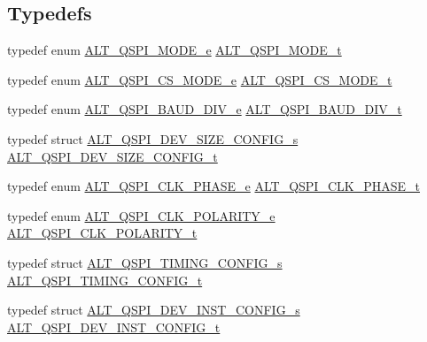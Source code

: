 \subsection*{Typedefs}
\begin{DoxyCompactItemize}
\item 
typedef enum \mbox{\hyperlink{group__ALT__QSPI__DEV__CFG_ga9270168a24ae2256573f5c8cbc5ec691}{A\+L\+T\+\_\+\+Q\+S\+P\+I\+\_\+\+M\+O\+D\+E\+\_\+e}} \mbox{\hyperlink{group__ALT__QSPI__DEV__CFG_ga4d03e307842e1ed33be0039a56ef62c3}{A\+L\+T\+\_\+\+Q\+S\+P\+I\+\_\+\+M\+O\+D\+E\+\_\+t}}
\item 
typedef enum \mbox{\hyperlink{group__ALT__QSPI__DEV__CFG_ga1963b85b7d2bbc2e56ba43d807c9c1b0}{A\+L\+T\+\_\+\+Q\+S\+P\+I\+\_\+\+C\+S\+\_\+\+M\+O\+D\+E\+\_\+e}} \mbox{\hyperlink{group__ALT__QSPI__DEV__CFG_gaffe96455cbf44fb3adb844c576c045fe}{A\+L\+T\+\_\+\+Q\+S\+P\+I\+\_\+\+C\+S\+\_\+\+M\+O\+D\+E\+\_\+t}}
\item 
typedef enum \mbox{\hyperlink{group__ALT__QSPI__DEV__CFG_gabea2bac97b47b7da32cf093e97de90e8}{A\+L\+T\+\_\+\+Q\+S\+P\+I\+\_\+\+B\+A\+U\+D\+\_\+\+D\+I\+V\+\_\+e}} \mbox{\hyperlink{group__ALT__QSPI__DEV__CFG_ga5a183c627f4dc5f1469a227c748b01ec}{A\+L\+T\+\_\+\+Q\+S\+P\+I\+\_\+\+B\+A\+U\+D\+\_\+\+D\+I\+V\+\_\+t}}
\item 
typedef struct \mbox{\hyperlink{structALT__QSPI__DEV__SIZE__CONFIG__s}{A\+L\+T\+\_\+\+Q\+S\+P\+I\+\_\+\+D\+E\+V\+\_\+\+S\+I\+Z\+E\+\_\+\+C\+O\+N\+F\+I\+G\+\_\+s}} \mbox{\hyperlink{group__ALT__QSPI__DEV__CFG_gaeeacf956659047dac90f9dde87817817}{A\+L\+T\+\_\+\+Q\+S\+P\+I\+\_\+\+D\+E\+V\+\_\+\+S\+I\+Z\+E\+\_\+\+C\+O\+N\+F\+I\+G\+\_\+t}}
\item 
typedef enum \mbox{\hyperlink{group__ALT__QSPI__DEV__CFG_ga88c43312b86922e74346d404644293fb}{A\+L\+T\+\_\+\+Q\+S\+P\+I\+\_\+\+C\+L\+K\+\_\+\+P\+H\+A\+S\+E\+\_\+e}} \mbox{\hyperlink{group__ALT__QSPI__DEV__CFG_ga96e07c567fa1c448c58c463c4068a136}{A\+L\+T\+\_\+\+Q\+S\+P\+I\+\_\+\+C\+L\+K\+\_\+\+P\+H\+A\+S\+E\+\_\+t}}
\item 
typedef enum \mbox{\hyperlink{group__ALT__QSPI__DEV__CFG_ga502f6a88a9d3e4e133385beabcb27487}{A\+L\+T\+\_\+\+Q\+S\+P\+I\+\_\+\+C\+L\+K\+\_\+\+P\+O\+L\+A\+R\+I\+T\+Y\+\_\+e}} \mbox{\hyperlink{group__ALT__QSPI__DEV__CFG_ga4255485b5b3ba0a98cb3294b3bebbc8f}{A\+L\+T\+\_\+\+Q\+S\+P\+I\+\_\+\+C\+L\+K\+\_\+\+P\+O\+L\+A\+R\+I\+T\+Y\+\_\+t}}
\item 
typedef struct \mbox{\hyperlink{structALT__QSPI__TIMING__CONFIG__s}{A\+L\+T\+\_\+\+Q\+S\+P\+I\+\_\+\+T\+I\+M\+I\+N\+G\+\_\+\+C\+O\+N\+F\+I\+G\+\_\+s}} \mbox{\hyperlink{group__ALT__QSPI__DEV__CFG_ga81b5f892a981d0ecb8fb454b3a1e1230}{A\+L\+T\+\_\+\+Q\+S\+P\+I\+\_\+\+T\+I\+M\+I\+N\+G\+\_\+\+C\+O\+N\+F\+I\+G\+\_\+t}}
\item 
typedef struct \mbox{\hyperlink{structALT__QSPI__DEV__INST__CONFIG__s}{A\+L\+T\+\_\+\+Q\+S\+P\+I\+\_\+\+D\+E\+V\+\_\+\+I\+N\+S\+T\+\_\+\+C\+O\+N\+F\+I\+G\+\_\+s}} \mbox{\hyperlink{group__ALT__QSPI__DEV__CFG_ga56516b11d66633580f54d1cc69c7aa8e}{A\+L\+T\+\_\+\+Q\+S\+P\+I\+\_\+\+D\+E\+V\+\_\+\+I\+N\+S\+T\+\_\+\+C\+O\+N\+F\+I\+G\+\_\+t}}
\end{DoxyCompactItemize}
